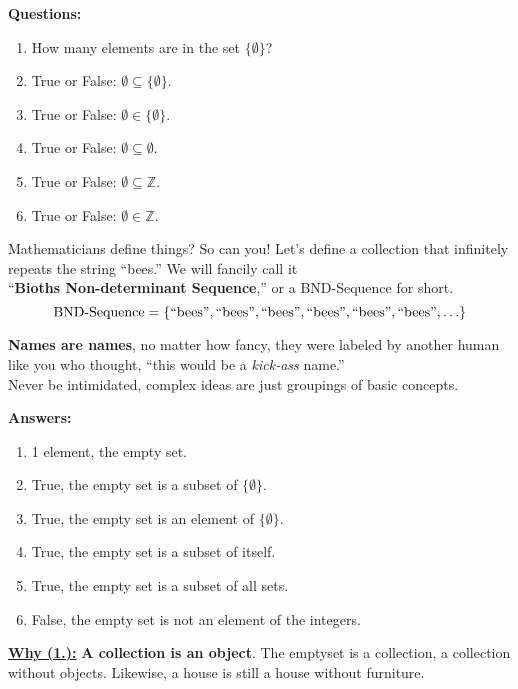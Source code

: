 \noindent
\textbf{Questions:}
\begin{enumerate}
    \item How many elements are in the set  $\{\emptyset\}$?
    \item True or False: $\emptyset \subseteq \{\emptyset\}$.
    \item True or False: $\emptyset \in \{\emptyset\}$.
    \item True or False: $\emptyset \subseteq \emptyset$.
    \item True or False: $\emptyset \subseteq \mathbb{Z}$.
    \item True or False: $\emptyset \in \mathbb{Z}$.
\end{enumerate}
\begin{Tip}
    Mathematicians define things? So can you! Let's define a collection that
    infinitely repeats the string ``bees.'' We will fancily call it\\
    ``\textbf{Bioths Non-determinant Sequence},'' or a BND-Sequence for short.
    $$\textnormal{BND-Sequence} = \{\textnormal{``bees''}, \textnormal{``bees''}, \textnormal{``bees''}, \textnormal{``bees''},
        \textnormal{``bees''}, \textnormal{``bees''}, \ldots\}$$

    \noindent
    \textbf{Names are names}, no matter how fancy, they were labeled
    by another human like you who thought, ``this would be a \textit{kick-ass} name.''\\
    Never be intimidated, complex ideas are just groupings of basic concepts.
\end{Tip}
\newpage
\noindent
\textbf{Answers:}
\begin{enumerate}
    \item 1 element, the empty set.
    \item True, the empty set is a subset of $\{\emptyset\}$.
    \item True, the empty set is an element of $\{\emptyset\}$.
    \item True, the empty set is a subset of itself.
    \item True, the empty set is a subset of all sets.
    \item False, the empty set is not an element of the integers.
\end{enumerate}

\vspace{4em}

\noindent
\underline{\textbf{Why (1.):}} \textbf{A collection is an object}. The emptyset is a collection,
a collection without objects. Likewise, a house is still a house without furniture.\\

